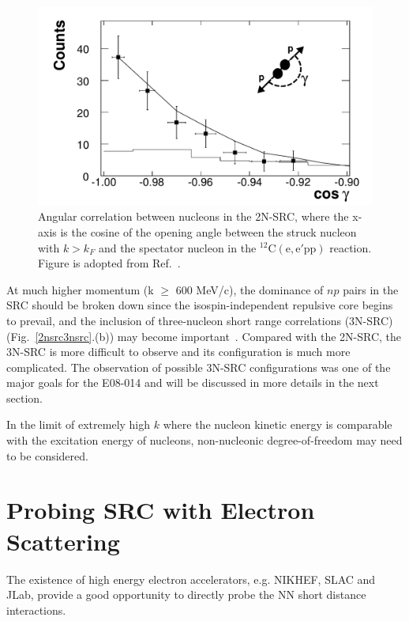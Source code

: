 \begin{figure}[!ht]
  \begin{center}
    \includegraphics[type=pdf,ext=.pdf,read=.pdf,width=0.65\linewidth]{./figures/physics/10yrSRC_fig5}
    \caption[Angular correlation between nucleons in the 2N-SRC]{\footnotesize{Angular correlation between nucleons in the 2N-SRC, where the x-axis is the cosine of the opening angle between the struck nucleon with $k>k_{F}$ and the spectator nucleon in the $\mathrm{^{12}C(e,e'pp)}$ reaction. Figure is adopted from Ref.~\cite{PhysRevLett.99.072501}.}}
    \label{triple_src_cos}
  \end{center}
\end{figure}  
 
 At much higher momentum (k $\geq$ 600 MeV/c), the dominance of $np$ pairs in the SRC should be broken down since the isospin-independent repulsive core begins to prevail, and the inclusion of three-nucleon short range correlations (3N-SRC) (Fig.~\ref{2nsrc3nsrc}.(b)) may become important~\cite{src_john}. Compared with the 2N-SRC, the 3N-SRC is more difficult to observe and its configuration is much more complicated. The observation of possible 3N-SRC configurations was one of the major goals for the E08-014 and will be discussed in more details in the next section.
 
  In the limit of extremely high $k$ where the nucleon kinetic energy is comparable with the excitation energy of nucleons, non-nucleonic degree-of-freedom may need to be considered.

\section{Probing SRC with Electron Scattering}
  The existence of high energy electron accelerators, e.g. NIKHEF, SLAC and JLab, provide a good opportunity to directly probe the NN short distance interactions. 
  
